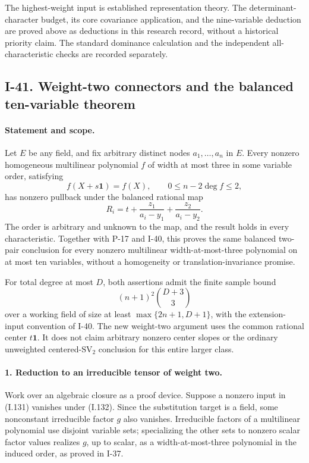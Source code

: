 The highest-weight input is established representation theory.
The determinant-character budget, its core covariance
application, and the nine-variable deduction are proved above
as deductions in this research record, without a historical
priority claim. The standard dominance calculation and the
independent all-characteristic checks are recorded separately.


\subsection{I-41. Weight-two connectors and the balanced ten-variable theorem}
\label{I-41}

\paragraph{Statement and scope.}
Let $E$ be any field, and fix arbitrary distinct nodes
$a_1,\ldots,a_n$ in $E$. Every nonzero homogeneous multilinear
polynomial $f$ of width at most three in some variable order,
satisfying
\[
 f(X+s\mathbf1)=f(X),\qquad 0\le n-2\deg f\le2,
 \tag{I.131}
\]
has nonzero pullback under the balanced rational map
\[
 R_i=t+\frac{z_1}{a_i-y_1}+\frac{z_2}{a_i-y_2}.
 \tag{I.132}
\]
The order is arbitrary and unknown to the map, and the result
holds in every characteristic. Together with P-17 and I-40,
this proves the same balanced two-pair conclusion for every
nonzero multilinear width-at-most-three polynomial on at most
ten variables, without a homogeneity or translation-invariance
promise.

For total degree at most $D$, both assertions admit the finite
sample bound
\[
 (n+1)^2\binom{D+3}{3}
 \tag{I.133}
\]
over a working field of size at least
$\max\{2n+1,D+1\}$, with the extension-input convention of I-40.
The new weight-two argument uses the common rational center
$t\mathbf1$. It does not claim arbitrary nonzero center slopes
or the ordinary unweighted centered-$\mathrm{SV}_2$ conclusion
for this entire larger class.

\paragraph{1. Reduction to an irreducible tensor of weight two.}
Work over an algebraic closure as a proof device. Suppose a
nonzero input in (I.131) vanishes under (I.132). Since the
substitution target is a field, some nonconstant irreducible
factor $g$ also vanishes. Irreducible factors of a multilinear
polynomial use disjoint variable sets; specializing the other
sets to nonzero scalar factor values realizes $g$, up to scalar,
as a width-at-most-three polynomial in the induced order, as
proved in I-37.

